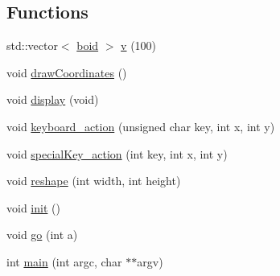\subsection*{Functions}
\begin{DoxyCompactItemize}
\item 
std\+::vector$<$ \hyperlink{classboid}{boid} $>$ \hyperlink{_parametric_2_starling-_simulation_2src_2main_8cpp_a3acab400bf3b180630e37bb94c8ca2d2}{v} (100)
\item 
void \hyperlink{_parametric_2_starling-_simulation_2src_2main_8cpp_a55d7e9aa910e339fa9eb7738680da6f5}{draw\+Coordinates} ()
\item 
void \hyperlink{_parametric_2_starling-_simulation_2src_2main_8cpp_a4ea013001a5fb47853d0fab8f8de35cd}{display} (void)
\item 
void \hyperlink{_parametric_2_starling-_simulation_2src_2main_8cpp_ae5474f3b746ffe82a9ec7693554a5258}{keyboard\+\_\+action} (unsigned char key, int x, int y)
\item 
void \hyperlink{_parametric_2_starling-_simulation_2src_2main_8cpp_a636e30ede2e55a392966309502eccc56}{special\+Key\+\_\+action} (int key, int x, int y)
\item 
void \hyperlink{_parametric_2_starling-_simulation_2src_2main_8cpp_a6819355374dd277347abd7c4235f0cd7}{reshape} (int width, int height)
\item 
void \hyperlink{_parametric_2_starling-_simulation_2src_2main_8cpp_a02fd73d861ef2e4aabb38c0c9ff82947}{init} ()
\item 
void \hyperlink{_parametric_2_starling-_simulation_2src_2main_8cpp_a31dc0f9d2e8cd7c620bacd665dc49d46}{go} (int a)
\item 
int \hyperlink{_parametric_2_starling-_simulation_2src_2main_8cpp_a3c04138a5bfe5d72780bb7e82a18e627}{main} (int argc, char $\ast$$\ast$argv)
\end{DoxyCompactItemize}
